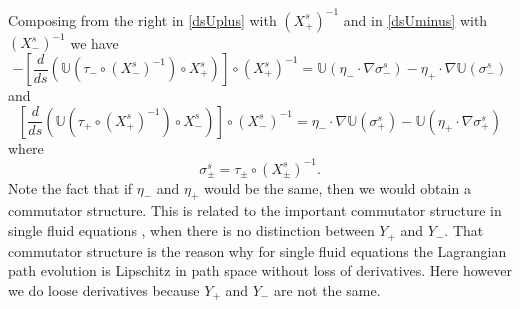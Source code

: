 \documentclass[11pt,reqno]{amsproc}
\newcommand{\la}{\label}
\newcommand{\fr}{\frac}
\newcommand{\na}{\nabla}
\newcommand{\be}{\begin{equation}}
\newcommand{\ee}{\end{equation}}
\begin{document}
Composing from the right in \eqref{dsUplus} with $(X_+^s)^{-1}$ and in \eqref{dsUminus} with $(X_{-}^s)^{-1}$ we have
\be
 -\left [\fr{d}{ds}\left( \mathbb U\left (\tau_-\circ (X^s_-)^{-1}\right)\circ X_+^s\right) \right] \circ (X^s_+)^{-1} =
 \mathbb U(\eta_-\cdot\nabla \sigma_-^s) - \eta_+\cdot\na \mathbb U(\sigma_-^s)
 \la{dsUminuseu}
 \ee
 and
 \be
 \left [\fr{d}{ds} \left(\mathbb U\left (\tau_+\circ (X_+^s)^{-1}\right)\circ X_{-}^s\right)\right]\circ (X_-^s)^{-1}
= \eta_-\cdot\na \mathbb U(\sigma_+^s) - \mathbb U(\eta_+\cdot \na\sigma_+^s)
\la{dsUpluseu}
\ee
 where 
 \be
 \sigma_{\pm}^s = \tau_{\pm}\circ(X^s_{\pm})^{-1}.
 \la{sigmaspm}
 \ee
 Note the fact that if $\eta_-$ and $\eta_+$ would be the same, then we would obtain a commutator structure.
 This is related to the important commutator structure in single fluid equations \cite{hydro}, when there is no distinction between $Y_+$ and $Y_-$. That commutator structure is the reason why for single fluid equations the Lagrangian path evolution is Lipschitz in path space without loss of derivatives. Here however we do loose derivatives because $Y_+$ and $Y_-$ are not the same. 
 
\end{document}
